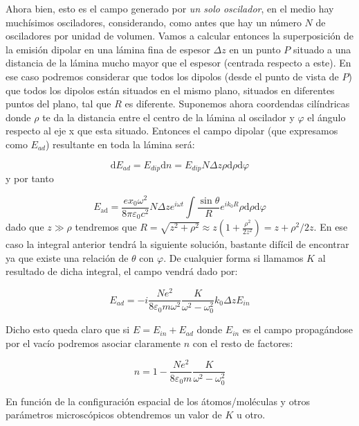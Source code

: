 \documentclass[12pt,a4paper]{article}
\newcommand{\D}{\mathrm{d}}
\numberwithin{equation}{section}
\numberwithin{figure}{section}
\begin{document}
Ahora bien, esto es el campo generado por \textit{un solo oscilador}, en el medio hay muchísimos osciladores, considerando, como antes que hay un número $N$ de osciladores por unidad de volumen. Vamos a calcular entonces la superposición de la emisión dipolar en una lámina fina de espesor $\Delta z$ en un punto $P$ situado a una distancia de la lámina mucho mayor que el espesor (centrada respecto a este). En ese caso podremos considerar que todos los dipolos (desde el punto de vista de $P$) que todos los dipolos están situados en el mismo plano, situados en diferentes puntos del plano, tal que $R$ es diferente. Suponemos ahora coordendas cilíndricas donde $\rho$ te da la distancia entre el centro de la lámina al oscilador y $\varphi$ el ángulo respecto al eje x que esta situado. Entonces el campo dipolar (que expresamos como $E_{ad}$) resultante en toda la lámina será:


\begin{equation}
\D E_{ad} = E_{dip} \D n = E_{dip} N \Delta z \rho \D \rho \D \varphi
\end{equation}
y por tanto

\begin{equation}
E_{\mathrm{ad}} = \dfrac{e x_0 \omega^2}{8 \pi \varepsilon_0 c^2} N \Delta z e^{i \omega t} \int \dfrac{\sin \theta}{R} e^{i k_0 R} \rho \D \rho \D \varphi
\end{equation} 
dado que $z \gg \rho$ tendremos que $R = \sqrt{z^2 + \rho^2} \approx z(1+\frac{\rho^2}{2z^2}) = z + \rho^2 / 2 z$. En ese caso la integral anterior tendrá la siguiente solución, bastante difícil de encontrar ya que existe una relación de $\theta$ con $\varphi$. De cualquier forma si llamamos $K$ al resultado de dicha integral, el campo vendrá dado por:

\begin{equation}
E_{ad} = - i \dfrac{N e^2}{8 \varepsilon_0 m \omega^2} \dfrac{K}{\omega^2 - \omega_0^2} k_0 \Delta z E_{in}
\end{equation}

Dicho esto queda claro que si $E=E_{in}+E_{ad}$ donde $E_{in}$ es el campo propagándose por el vacío podremos asociar claramente $n$ con el resto de factores:

\begin{equation}
n = 1 -   \dfrac{N e^2}{8 \varepsilon_0 m} \dfrac{K}{\omega^2 - \omega_0^2} \label{Ec:7.5.0.38}
\end{equation}

En función de la configuración espacial de los átomos/moléculas y otros parámetros microscópicos obtendremos un valor de $K$ u otro. 
\end{document}

